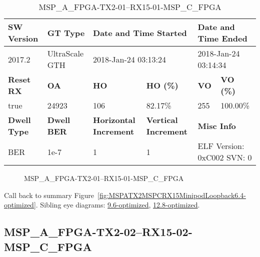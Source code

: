 \begin{table}[h]
\centering
\caption{MSP\_A\_FPGA-TX2-01--RX15-01-MSP\_C\_FPGA}
\label{tab:MSPAFPGATX201RX1501MSPCFPGA6.4-optimized}
\begin{tabular}{@{}|l|l|l|l|l|l|@{}}
\toprule
\textbf{SW Version}                & \textbf{GT Type}   & \multicolumn{2}{l|}{\textbf{Date and Time Started}}            & \multicolumn{2}{l|}{\textbf{Date and Time Ended}}        \\ \midrule
2017.2                       & UltraScale GTH          & \multicolumn{2}{l|}{2018-Jan-24 03:13:24}                   & \multicolumn{2}{l|}{2018-Jan-24 03:14:34}               \\ \midrule
\textbf{Reset RX}                  & \textbf{OA} & \textbf{HO}   & \textbf{HO (\%)} & \textbf{VO} & \textbf{VO (\%)} \\ \midrule
true & 24923        & 106          & 82.17\%        & 255        & 100.00\%       \\ \midrule
\textbf{Dwell Type}                & \textbf{Dwell BER} & \textbf{Horizontal Increment} & \textbf{Vertical Increment}    & \multicolumn{2}{l|}{\textbf{Misc Info}}                  \\ \midrule
BER                            & 1e-7        & 1        & 1           & \multicolumn{2}{l|}{ELF Version: 0xC002 SVN: 0}                         \\ \bottomrule
\end{tabular}
\end{table}

\begin{figure}[h]
\caption{MSP\_A\_FPGA-TX2-01--RX15-01-MSP\_C\_FPGA} \label{fig:MSPAFPGATX201RX1501MSPCFPGA6.4-optimized}
\end{figure}

Call back to summary Figure~\ref{fig:MSPATX2MSPCRX15MinipodLoopback6.4-optimized}.
Sibling eye diagrams: \hyperref[sec:MSPAFPGATX201RX1501MSPCFPGA9.6-optimized]{9.6-optimized}, \hyperref[sec:MSPAFPGATX201RX1501MSPCFPGA12.8-optimized]{12.8-optimized}.

\clearpage
\newpage


\subsection{MSP\_A\_FPGA-TX2-02--RX15-02-MSP\_C\_FPGA}\label{sec:MSPAFPGATX202RX1502MSPCFPGA6.4-optimized}

